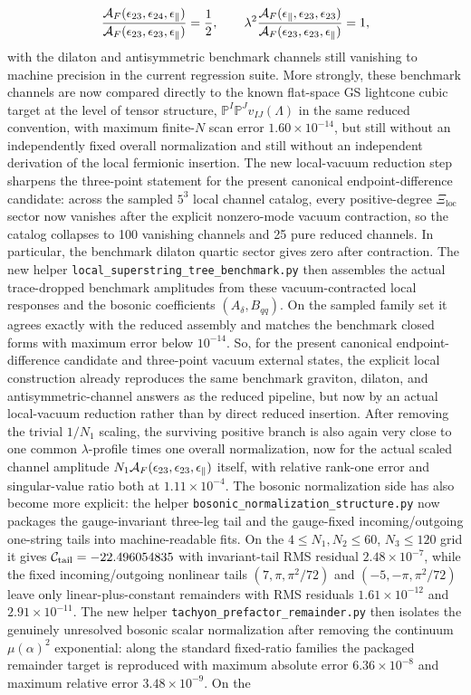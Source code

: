 \documentclass[11pt]{article}
\numberwithin{equation}{section}
\begin{document}
\[
\frac{{\cal A}_F(\epsilon_{23},\epsilon_{24},\epsilon_\parallel)}
{{\cal A}_F(\epsilon_{23},\epsilon_{23},\epsilon_\parallel)}=\frac12,
\qquad
\lambda^2
\frac{{\cal A}_F(\epsilon_\parallel,\epsilon_{23},\epsilon_{23})}
{{\cal A}_F(\epsilon_{23},\epsilon_{23},\epsilon_\parallel)}=1,
\]
with the dilaton and antisymmetric benchmark channels still vanishing to machine precision in the current regression suite. More strongly, these benchmark channels are now compared directly to the known flat-space GS lightcone cubic target at the level of tensor structure,
\(
\mathbb{P}^I\mathbb{P}^J v_{IJ}(\Lambda)
\)
in the same reduced convention, with maximum finite-$N$ scan error $1.60\times10^{-14}$, but still without an independently fixed overall normalization and still without an independent derivation of the local fermionic insertion. The new local-vacuum reduction step sharpens the three-point statement for the present canonical endpoint-difference candidate: across the sampled $5^3$ local channel catalog, every positive-degree $\Xi_{\mathrm{loc}}$ sector now vanishes after the explicit nonzero-mode vacuum contraction, so the catalog collapses to 100 vanishing channels and 25 pure reduced channels. In particular, the benchmark dilaton quartic sector gives zero after contraction. The new helper \texttt{local\_superstring\_tree\_benchmark.py} then assembles the actual trace-dropped benchmark amplitudes from these vacuum-contracted local responses and the bosonic coefficients $(A_\delta,B_{qq})$. On the sampled family set it agrees exactly with the reduced assembly and matches the benchmark closed forms with maximum error below $10^{-14}$. So, for the present canonical endpoint-difference candidate and three-point vacuum external states, the explicit local construction already reproduces the same benchmark graviton, dilaton, and antisymmetric-channel answers as the reduced pipeline, but now by an actual local-vacuum reduction rather than by direct reduced insertion. After removing the trivial $1/N_1$ scaling, the surviving positive branch is also again very close to one common $\lambda$-profile times one overall normalization, now for the actual scaled channel amplitude $N_1{\cal A}_F(\epsilon_{23},\epsilon_{23},\epsilon_\parallel)$ itself, with relative rank-one error and singular-value ratio both at $1.11\times 10^{-4}$. The bosonic normalization side has also become more explicit: the helper \texttt{bosonic\_normalization\_structure.py} now packages the gauge-invariant three-leg tail and the gauge-fixed incoming/outgoing one-string tails into machine-readable fits. On the $4\le N_1,N_2\le 60$, $N_3\le 120$ grid it gives ${\cal C}_{\mathrm{tail}}=-22.496054835$ with invariant-tail RMS residual $2.48\times 10^{-7}$, while the fixed incoming/outgoing nonlinear tails $(7,\pi,\pi^2/72)$ and $(-5,-\pi,\pi^2/72)$ leave only linear-plus-constant remainders with RMS residuals $1.61\times 10^{-12}$ and $2.91\times 10^{-11}$. The new helper \texttt{tachyon\_prefactor\_remainder.py} then isolates the genuinely unresolved bosonic scalar normalization after removing the continuum $\mu(\alpha)^2$ exponential: along the standard fixed-ratio families the packaged remainder target is reproduced with maximum absolute error $6.36\times 10^{-8}$ and maximum relative error $3.48\times 10^{-9}$. On the 
\end{document}
